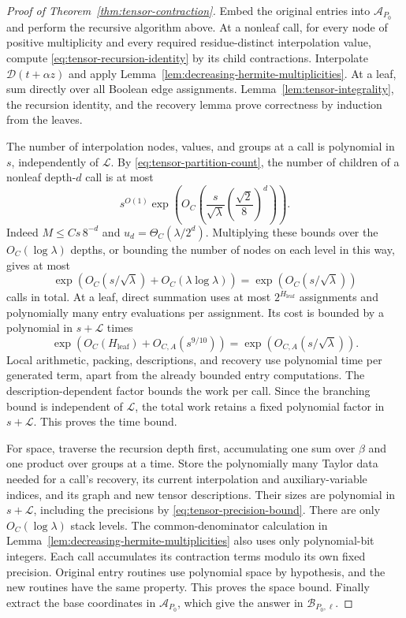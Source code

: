 \begin{proof}[Proof of Theorem~\ref{thm:tensor-contraction}]
Embed the original entries into $\mathcal A_{P_0}$ and perform
the recursive algorithm above.  At a nonleaf call, for every node
of positive multiplicity and every required residue-distinct
interpolation value, compute \eqref{eq:tensor-recursion-identity}
by its child contractions.  Interpolate $\mathcal D(t+\alpha z)$ and apply
Lemma~\ref{lem:decreasing-hermite-multiplicities}.  At a leaf, sum directly over all
Boolean edge assignments.  Lemma~\ref{lem:tensor-integrality},
the recursion identity, and the recovery lemma prove correctness
by induction from the leaves.

The number of interpolation nodes, values, and groups at a call
is polynomial in $s$, independently of $\mathcal L$.
By \eqref{eq:tensor-partition-count}, the number of children of
a nonleaf depth-$d$ call is at most
\[
 s^{O(1)}\exp\left(
       O_C\left(\frac{s}{\sqrt\lambda}
                    \left(\frac{\sqrt2}{8}\right)^d\right)\right).
\]
Indeed $M\le Cs\,8^{-d}$ and
$u_d=\Theta_C(\lambda/2^d)$.  Multiplying these bounds over the
$O_C(\log\lambda)$ depths, or bounding the number of nodes on
each level in this way, gives at most
\[
 \exp\left(O_C(s/\sqrt\lambda)
                   +O_C(\lambda\log\lambda)\right)
       =\exp(O_C(s/\sqrt\lambda))
\]
calls in total.  At a leaf, direct summation uses at most $2^{H_{\mathrm{leaf}}}$
assignments and polynomially many entry evaluations per assignment.
Its cost is bounded by a polynomial in $s+\mathcal L$ times
\[
 \exp(O_C(H_{\mathrm{leaf}})+O_{C,A}(s^{9/10}))
   =\exp(O_{C,A}(s/\sqrt\lambda)).
\]
Local arithmetic, packing, descriptions, and recovery use
polynomial time per generated term, apart from the already
bounded entry computations.  The description-dependent factor
bounds the work per call. Since the branching bound is independent of
$\mathcal L$, the total work retains a fixed polynomial factor in $s+\mathcal L$.
This proves the time bound.

For space, traverse the recursion depth first, accumulating one
sum over $\beta$ and one product over groups at a time.
Store the polynomially many Taylor data needed for a call's
recovery, its current interpolation and auxiliary-variable indices, and its
graph and new tensor descriptions.  Their sizes are polynomial
in $s+\mathcal L$, including the precisions by
\eqref{eq:tensor-precision-bound}.  There are only
$O_C(\log\lambda)$ stack levels.  The common-denominator
calculation in Lemma~\ref{lem:decreasing-hermite-multiplicities} also uses only
polynomial-bit integers. Each call accumulates its contraction terms
modulo its own fixed precision.
Original entry routines use polynomial space by hypothesis,
and the new routines have the same property.
This proves the space bound.  Finally extract the base
coordinates in $\mathcal A_{P_0}$, which give the answer in
$\mathcal B_{P_0,\ell}$.
\end{proof}
